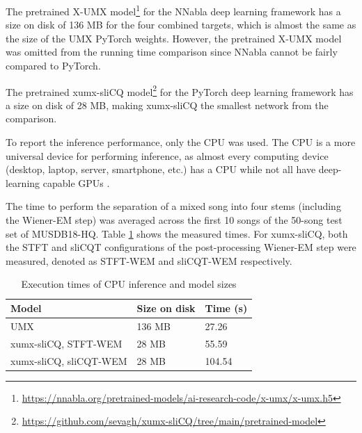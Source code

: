 \documentclass[report.tex]{subfiles}
\begin{document}
The pretrained X-UMX model\footnote{\url{https://nnabla.org/pretrained-models/ai-research-code/x-umx/x-umx.h5}} for the NNabla deep learning framework has a size on disk of 136 MB for the four combined targets, which is almost the same as the size of the UMX PyTorch weights. However, the pretrained X-UMX model was omitted from the running time comparison since NNabla cannot be fairly compared to PyTorch.

The pretrained xumx-sliCQ model\footnote{\url{https://github.com/sevagh/xumx-sliCQ/tree/main/pretrained-model}} for the PyTorch deep learning framework has a size on disk of 28 MB, making xumx-sliCQ the smallest network from the comparison.

To report the inference performance, only the CPU was used. The CPU is a more universal device for performing inference, as almost every computing device (desktop, laptop, server, smartphone, etc.) has a CPU while not all have deep-learning capable GPUs \parencite{deepcpuinf, deepcpuinf2}.

The time to perform the separation of a mixed song into four stems (including the Wiener-EM step) was averaged across the first 10 songs of the 50-song test set of MUSDB18-HQ. Table \ref{table:infperf} shows the measured times. For xumx-sliCQ, both the STFT and sliCQT configurations of the post-processing Wiener-EM step were measured, denoted as STFT-WEM and sliCQT-WEM respectively.

\begin{table}[ht]
	\centering
	\caption{Execution times of CPU inference and model sizes}
	\label{table:infperf}
	\begin{tabular}{ |l|l|l| }
	 \hline
		Model & Size on disk & Time (s) \\
	 \hline
	 \hline
		UMX & 136 MB & 27.26  \\
	 \hline
		xumx-sliCQ, STFT-WEM & 28 MB & 55.59  \\
	 \hline
		xumx-sliCQ, sliCQT-WEM & 28 MB & 104.54  \\
	 \hline
\end{tabular}
\end{table}
\end{document}
